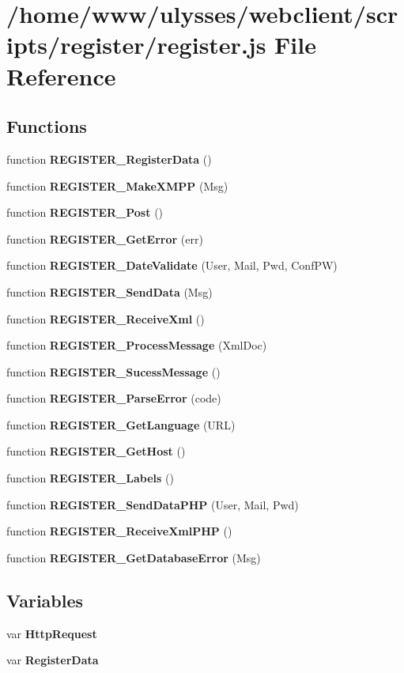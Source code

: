 \section{/home/www/ulysses/webclient/scripts/register/register.js File Reference}
\label{register_8js}
\subsection*{Functions}
\begin{CompactItemize}
\item 
function {\bf REGISTER\_\-RegisterData} ()
\item 
function {\bf REGISTER\_\-MakeXMPP} (Msg)
\item 
function {\bf REGISTER\_\-Post} ()
\item 
function {\bf REGISTER\_\-GetError} (err)
\item 
function {\bf REGISTER\_\-DateValidate} (User, Mail, Pwd, ConfPW)
\item 
function {\bf REGISTER\_\-SendData} (Msg)
\item 
function {\bf REGISTER\_\-ReceiveXml} ()
\item 
function {\bf REGISTER\_\-ProcessMessage} (XmlDoc)
\item 
function {\bf REGISTER\_\-SucessMessage} ()
\item 
function {\bf REGISTER\_\-ParseError} (code)
\item 
function {\bf REGISTER\_\-GetLanguage} (URL)
\item 
function {\bf REGISTER\_\-GetHost} ()
\item 
function {\bf REGISTER\_\-Labels} ()
\item 
function {\bf REGISTER\_\-SendDataPHP} (User, Mail, Pwd)
\item 
function {\bf REGISTER\_\-ReceiveXmlPHP} ()
\item 
function {\bf REGISTER\_\-GetDatabaseError} (Msg)
\end{CompactItemize}
\subsection*{Variables}
\begin{CompactItemize}
\item 
var {\bf HttpRequest}
\item 
var {\bf RegisterData}
\end{CompactItemize}


